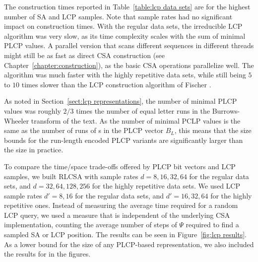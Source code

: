 The construction times reported in Table~\ref{table:lcp data sets} are for the highest number of SA and LCP samples. Note that sample rates had no significant impact on construction times. With the regular data sets, the irreducible LCP algorithm was very slow, as its time complexity scales with the sum of minimal PLCP values. A parallel version that scans different sequences in different threads might still be as fast as direct CSA construction (see Chapter~\ref{chapter:construction}), as the basic CSA operations parallelize well. The algorithm was much faster with the highly repetitive data sets, while still being $5$ to $10$ times slower than the LCP construction algorithm of Fischer \cite{Fischer2011}.

As noted in Section~\ref{sect:lcp representations}, the number of minimal PLCP values was roughly $2/3$ times the number of equal letter runs in the Burrows-Wheeler transform of the text. As the number of minimal PCLP values is the same as the number of runs of \onebit{}s in the PLCP vector $B_{L}$, this means that the size bounds for the run-length encoded PLCP variants are significantly larger than the size in practice.

To compare the time/space trade-offs offered by PLCP bit vectors and LCP samples, we built RLCSA with sample rates $d = 8, 16, 32, 64$ for the regular data sets, and $d = 32, 64, 128, 256$ for the highly repetitive data sets. We used LCP sample rates $d' = 8, 16$ for the regular data sets, and $d' = 16, 32, 64$ for the highly repetitive ones. Instead of measuring the average time required for a random LCP query, we used a measure that is independent of the underlying CSA implementation, counting the average number of steps of $\Psi$ required to find a sampled SA or LCP position. The results can be seen in Figure~\ref{fig:lcp results}. As a lower bound for the size of any PLCP-based representation, we also included the results for \locate{} in the figures.

